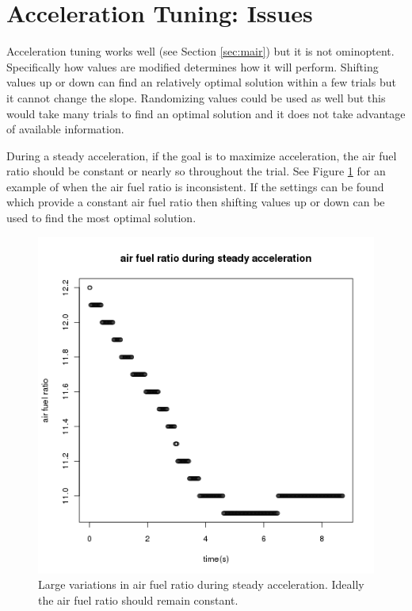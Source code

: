 \documentclass{article}
\begin{document}
\section{Acceleration Tuning: Issues}

Acceleration tuning works well (see Section \ref{sec:mair})
but it is not ominoptent.
Specifically how values are modified determines how it will perform.
Shifting values up or down can find an relatively optimal solution within a
few trials but it cannot change the slope.
Randomizing values could be used as well but this would take many
trials to find an optimal solution and it does not take advantage of
available information.

During a steady acceleration, if the goal is to maximize acceleration,
the air fuel ratio should be constant or nearly so throughout the trial.
See Figure \ref{fig:ati} for an example of when the air fuel ratio is inconsistent.
If the settings can be found which provide a constant air fuel ratio then
shifting values up or down can be used to find the most optimal solution.

\begin{figure}[!htb]
\center
\includegraphics[scale=0.5]{accel-afr/msq-accel-tmp-20110625-15:21:06-rtdata-single.png}
\caption{Large variations in air fuel ratio during steady acceleration.
Ideally the air fuel ratio should remain constant.}
\label{fig:ati}
\end{figure}
\end{document}
